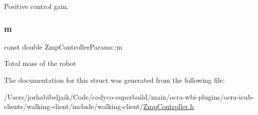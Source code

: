 Positive control gain. \hypertarget{structZmpControllerParams_a1a3eea24e276953f2e74c4066b24106c}{}\label{structZmpControllerParams_a1a3eea24e276953f2e74c4066b24106c} 
\subsubsection{\texorpdfstring{m}{m}}
{\footnotesize\ttfamily const double Zmp\+Controller\+Params\+::m}

Total mass of the robot 

The documentation for this struct was generated from the following file\+:\begin{DoxyCompactItemize}
\item 
/\+Users/jorhabibeljaik/\+Code/codyco-\/superbuild/main/ocra-\/wbi-\/plugins/ocra-\/icub-\/clients/walking-\/client/include/walking-\/client/\hyperlink{ZmpController_8h}{Zmp\+Controller.\+h}\end{DoxyCompactItemize}

